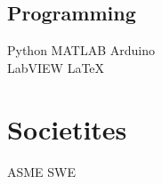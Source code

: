 \documentclass[]{deedy-resume-openfont}
\begin{document}
\begin{minipage}[t]{0.33\textwidth}
\subsection{Programming}
Python \textbullet{}   MATLAB \textbullet{} Arduino \\
LabVIEW \textbullet{}  \LaTeX\ \\ 

\sectionsep

\section{Societites}
ASME \textbullet{} SWE

\sectionsep

%
%

\end{minipage} 
\hfill
\end{document}
